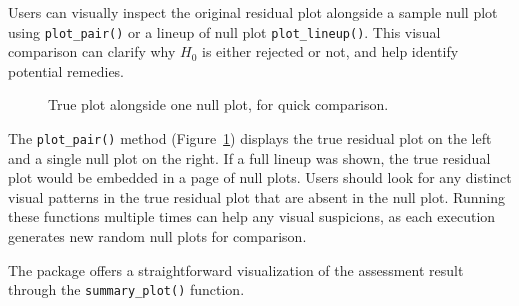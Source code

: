 \documentclass[
doublespace,
  times]{anzsauth}
\newenvironment{Shaded}{\begin{snugshade}}{\end{snugshade}}
\newcommand{\FunctionTok}[1]{\textcolor[rgb]{0.28,0.35,0.67}{#1}}
\newcommand{\NormalTok}[1]{\textcolor[rgb]{0.00,0.23,0.31}{#1}}
\newcommand{\SpecialCharTok}[1]{\textcolor[rgb]{0.37,0.37,0.37}{#1}}
\providecommand{\DIFaddbeginFL}{} %
\providecommand{\DIFaddendFL}{} %
\providecommand{\DIFdelbeginFL}{} %
\providecommand{\DIFdelendFL}{} %
\newcommand{\DIFscaledelfig}{0.5}
\newlength{\DIFdelgraphicswidth} %
\newlength{\DIFdelgraphicsheight} %
\newcommand{\DIFaddincludegraphics}[2][]{{\color{blue}\fbox{\DIFOincludegraphics[#1]{#2}}}} %
\newcommand{\DIFdelincludegraphics}[2][]{%
\sbox{\DIFdelgraphicsbox}{\DIFOincludegraphics[#1]{#2}}%
\settoboxwidth{\DIFdelgraphicswidth}{\DIFdelgraphicsbox} %
\settoboxtotalheight{\DIFdelgraphicsheight}{\DIFdelgraphicsbox} %
\scalebox{\DIFscaledelfig}{%
\parbox[b]{\DIFdelgraphicswidth}{\usebox{\DIFdelgraphicsbox}\\[-\baselineskip] \rule{\DIFdelgraphicswidth}{0em}}\llap{\resizebox{\DIFdelgraphicswidth}{\DIFdelgraphicsheight}{%
\setlength{\unitlength}{\DIFdelgraphicswidth}%
\begin{picture}(1,1)%
\thicklines\linethickness{2pt} %
{\color[rgb]{1,0,0}\put(0,0){\framebox(1,1){}}}%
{\color[rgb]{1,0,0}\put(0,0){\line( 1,1){1}}}%
{\color[rgb]{1,0,0}\put(0,1){\line(1,-1){1}}}%
\end{picture}%
}\hspace*{3pt}}} %
} %
\DeclareRobustCommand{\DIFaddbeginFL}{\DIFOaddbeginFL \let\includegraphics\DIFaddincludegraphics} %
\DeclareRobustCommand{\DIFaddendFL}{\DIFOaddendFL \let\includegraphics\DIFOincludegraphics} %
\DeclareRobustCommand{\DIFdelbeginFL}{\DIFOdelbeginFL \let\includegraphics\DIFdelincludegraphics} %
\DeclareRobustCommand{\DIFdelendFL}{\DIFOaddendFL \let\includegraphics\DIFOincludegraphics} %
\begin{document}
Users can visually inspect the original residual plot alongside a sample
null plot using \texttt{plot\_pair()} or a lineup of null plot
\texttt{plot\_lineup()}. This visual comparison can clarify why \(H_0\)
is either rejected or not, and help identify potential remedies.

\begin{Shaded}
\end{Shaded}

\begin{figure}[H]

\DIFdelbeginFL %


\DIFdelendFL \DIFaddbeginFL {}
\DIFaddendFL

\caption{\label{fig-plot-pair}True plot alongside one null plot, for
quick comparison.}

\end{figure}%

The \texttt{plot\_pair()} method (Figure~\ref{fig-plot-pair}) displays
the true residual plot on the left and a single null plot on the right.
If a full lineup was shown, the true residual plot would be embedded in
a page of null plots. Users should look for any distinct visual patterns
in the true residual plot that are absent in the null plot. Running
these functions multiple times can help any visual suspicions, as each
execution generates new random null plots for comparison.

The package offers a straightforward visualization of the assessment
result through the \texttt{summary\_plot()} function.
\end{document}

